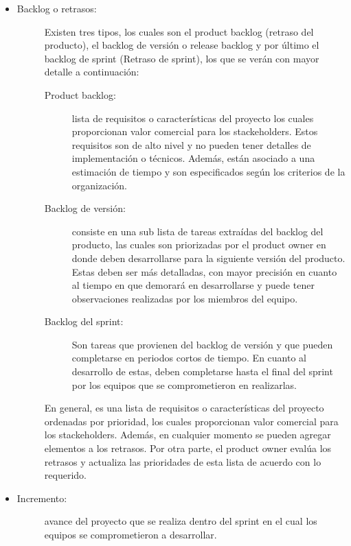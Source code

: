 \begin{itemize}
    \item   \begin{description}
                \item[Backlog o retrasos: ] Existen tres tipos, los cuales son el product backlog (retraso del producto), el backlog de versión o release backlog y por último el backlog de sprint (Retraso de sprint), los que se verán con mayor detalle a continuación:
                
                \begin{description}
                    \item[Product backlog: ] lista de requisitos o características del proyecto los cuales proporcionan valor comercial para los stackeholders. Estos requisitos son de alto nivel y no pueden tener detalles de implementación o técnicos. Además, están asociado a una estimación de tiempo y son especificados según los criterios de la organización.
                     
                    \item[Backlog de versión: ]  consiste en una sub lista de tareas extraídas del backlog del producto, las cuales son priorizadas por el product owner en donde deben desarrollarse para la siguiente versión del producto. Estas deben ser más detalladas, con mayor precisión en cuanto al tiempo en que demorará en desarrollarse y puede tener observaciones realizadas por los miembros del equipo.
                     
                    \item[Backlog del sprint: ] Son tareas que provienen del backlog de versión y que pueden completarse en periodos cortos de tiempo. En cuanto al desarrollo de estas, deben completarse hasta el final del sprint por los equipos que se comprometieron en realizarlas.
                \end{description}
                
                En general, es una lista de requisitos o características del proyecto ordenadas por prioridad, los cuales proporcionan valor comercial para los stackeholders. Además, en cualquier momento se pueden agregar elementos a los retrasos. Por otra parte, el product owner evalúa los retrasos y actualiza las prioridades de esta lista de acuerdo con lo requerido. 
            \end{description}    

    \item   \begin{description}
                \item[Incremento:] avance del proyecto que se realiza dentro del sprint en el cual los equipos se comprometieron a desarrollar.
            \end{description}
    

\end{itemize}
